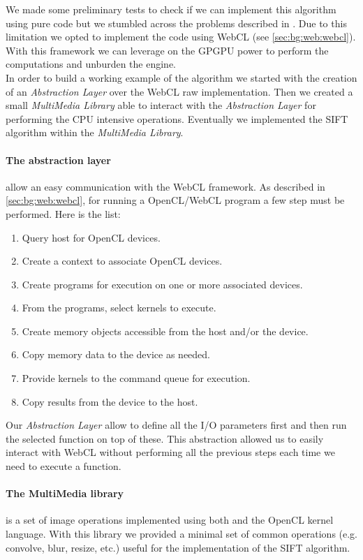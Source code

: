We made some preliminary tests to check if we can implement this algorithm using
pure \js{} code but we stumbled across the problems described in
. Due to this limitation we opted to implement the
code using \ac{WebCL} (see \ref{sec:bg:web:webcl}). With this framework we can
leverage on the \ac{GPGPU} power to perform the computations and unburden the
\js{} engine.\\ 

In order to build a working example of the algorithm we started with the creation
of an \emph{Abstraction Layer} over the \ac{WebCL} raw implementation. Then we created
a small \emph{MultiMedia Library} able to interact with the \emph{Abstraction
Layer} for performing the CPU intensive operations. Eventually we implemented the
\ac{SIFT} algorithm within the \emph{MultiMedia Library}.

\paragraph{The abstraction layer} allow an easy communication with the \ac{WebCL}
framework. As described in \ref{sec:bg:web:webcl}, for running a OpenCL/WebCL
program a few step must be performed. Here is the list:
\begin{enumerate}
    \item Query host for \ac{OpenCL} devices.
    \item Create a context to associate \ac{OpenCL} devices.
    \item Create programs for execution on one or more associated devices.
    \item From the programs, select kernels to execute.
    \item Create memory objects accessible from the host and/or the device.
    \item Copy memory data to the device as needed.
    \item Provide kernels to the command queue for execution.
    \item Copy results from the device to the host.
\end{enumerate}
\noindent Our \emph{Abstraction Layer} allow to define all the I/O parameters
first and then run the selected  function on top of these. This abstraction
allowed us to easily interact with \ac{WebCL} without performing all the previous
steps each time we need to execute a  function.


\paragraph{The MultiMedia library} is a set of image operations implemented using
both \js{} and the OpenCL kernel language. With this library we provided a minimal
set of common operations (e.g. convolve, blur, resize, etc.) useful for the
implementation of the \ac{SIFT} algorithm.\\

